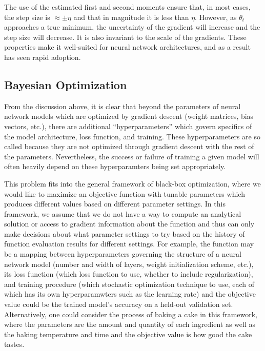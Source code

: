 The use of the estimated first and second moments ensure that, in most cases, the step size is $\approx \pm \eta$ and that in magnitude it is less than $\eta$.
However, as $\theta_t$ approaches a true minimum, the uncertainty of the gradient will increase and the step size will decrease.
It is also invariant to the scale of the gradients.
These properties make it well-suited for neural network architectures, and as a result has seen rapid adoption.

\subsection{Bayesian Optimization}
\label{sec:bayesian_optimization}

From the discussion above, it is clear that beyond the parameters of neural network models which are optimized by gradient descent (weight matrices, bias vectors, etc.), there are additional ``hyperparameters'' which govern specifics of the model architecture, loss function, and training.
These hyperparameters are so called because they are not optimized through gradient descent with the rest of the parameters.
Nevertheless, the success or failure of training a given model will often heavily depend on these hyperparamters being set appropriately.

This problem fits into the general framework of black-box optimization, where we would like to maximize an objective function with tunable parameters which produces different values based on different parameter settings.
In this framework, we assume that we do not have a way to compute an analytical solution or access to gradient information about the function and thus can only make decisions about what parameter settings to try based on the history of function evaluation results for different settings.
For example, the function may be a mapping between hyperparameters governing the structure of a neural network model (number and width of layers, weight initialization scheme, etc.), its loss function (which loss function to use, whether to include regularization), and training procedure (which stochastic optimization technique to use, each of which has its own hyperparamwters such as the learning rate) and the objective value could be the trained model's accuracy on a held-out validation set.
Alternatively, one could consider the process of baking a cake in this framework, where the parameters are the amount and quantity of each ingredient as well as the baking temperature and time and the objective value is how good the cake tastes.


